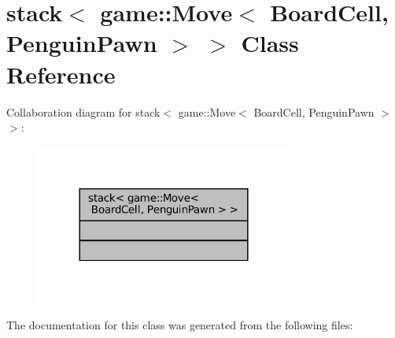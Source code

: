 \hypertarget{classstd_1_1stack_3_01game_1_1_move_3_01_board_cell_00_01_penguin_pawn_01_4_01_4}{}\section{stack$<$ game\+:\+:Move$<$ Board\+Cell, Penguin\+Pawn $>$ $>$ Class Reference}
\label{classstd_1_1stack_3_01game_1_1_move_3_01_board_cell_00_01_penguin_pawn_01_4_01_4}


Collaboration diagram for stack$<$ game\+:\+:Move$<$ Board\+Cell, Penguin\+Pawn $>$ $>$\+:
\nopagebreak
\begin{figure}[H]
\begin{center}
\leavevmode
\includegraphics[width=240pt]{classstd_1_1stack_3_01game_1_1_move_3_01_board_cell_00_01_penguin_pawn_01_4_01_4__coll__graph}
\end{center}
\end{figure}


The documentation for this class was generated from the following files\+: